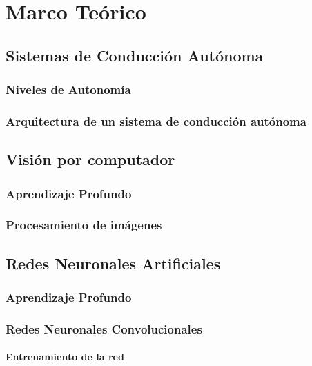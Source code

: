\chapter{Marco Teórico} \label{ch:m_teorico}

\section{Sistemas de Conducción Autónoma}

    \subsection{Niveles de Autonomía}

    \subsection{Arquitectura de un sistema de conducción autónoma}


\section{Visión por computador}
    \subsection{Aprendizaje Profundo}

    \subsection{Procesamiento de imágenes}

\section{Redes Neuronales Artificiales}

    \subsection{Aprendizaje Profundo}

    \subsection{Redes Neuronales Convolucionales}
        \subsubsection{Entrenamiento de la red}
